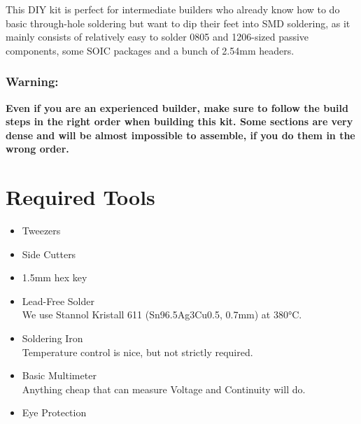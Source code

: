 \documentclass[12pt, a4paper]{article}
\begin{document}
\vspace{3mm}

This DIY kit is perfect for intermediate builders who already know how to do basic through-hole
soldering but want to dip their feet into SMD soldering, as it mainly consists of relatively
easy to solder 0805 and 1206-sized passive components, some SOIC packages and a bunch of 2.54mm
headers.

{
    \color{red}
    \subsubsection*{Warning:}
    \vspace{-3mm}
    \textbf{%
        Even if you are an experienced builder, make sure to follow the build steps in the right
        order when building this kit. Some sections are very dense and will be almost impossible
        to assemble, if you do them in the wrong order.
    }
    \vspace{5mm}
}

\pagebreak

\section*{Required Tools}

\begin{itemize}
    \item Tweezers
    \item Side Cutters
    \item 1.5mm hex key
    \item Lead-Free Solder
    \\ {\small We use Stannol Kristall 611 (Sn96.5Ag3Cu0.5, 0.7mm) at 380°C.}
    \item Soldering Iron
    \\ {\small Temperature control is nice, but not strictly required.}
    \item Basic Multimeter
    \\ {\small Anything cheap that can measure Voltage and Continuity will do.}
    \item Eye Protection
\end{itemize}
\end{document}
